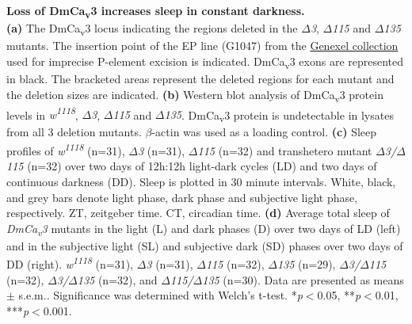 \label{fig:S2}
\textbf{Loss of DmCa\textsubscript{v}3 increases sleep in constant darkness.}
\\
\textbf{(a)} The DmCa\textsubscript{v}3 locus indicating the regions deleted in the \emph{$\Delta$3}, \emph{$\Delta$115} and \emph{$\Delta$135} mutants.
The insertion point of the EP line (G1047) from the \href{http://genexel.kaist.ac.kr}{Genexel collection} used for imprecise P-element excision is indicated.
DmCa\textsubscript{v}3 exons are represented in black.
The bracketed areas represent the deleted regions for each mutant and the deletion sizes are indicated.
\textbf{(b)} Western blot analysis of DmCa\textsubscript{v}3 protein levels in \emph{w\textsuperscript{1118}}, \emph{$\Delta$3}, \emph{$\Delta$115} and \emph{$\Delta$135}.
DmCa\textsubscript{v}3 protein is undetectable in lysates from all 3 deletion mutants.
$\beta$-actin was used as a loading control.
\textbf{(c)} Sleep profiles of \emph{w\textsuperscript{1118}} (n=31), \emph{$\Delta$3} (n=31), \emph{$\Delta$115} (n=32) and transhetero mutant \emph{$\Delta$3/$\Delta$115} (n=32) over two days of 12h:12h light-dark cycles (LD) and two days of continuous darkness (DD).
Sleep is plotted in 30 minute intervals.
White, black, and grey bars denote light phase, dark phase and subjective light phase, respectively.
ZT, zeitgeber time.
CT, circadian time.
\textbf{(d)} Average total sleep of \emph{DmCa\textsubscript{v}3} mutants in the light (L) and dark phases (D) over two days of LD (left) and in the subjective light (SL) and subjective dark (SD) phases over two days of DD (right).
\emph{w\textsuperscript{1118}} (n=31), \emph{$\Delta$3} (n=31), \emph{$\Delta$115} (n=32), \emph{$\Delta$135} (n=29), \emph{$\Delta$3/$\Delta$115} (n=32), \emph{$\Delta$3/$\Delta$135} (n=32), and \emph{$\Delta$115/$\Delta$135} (n=30).
Data are presented as means $\pm$ s.e.m..
Significance was determined with Welch's t-test.
*\emph{p}$<$0.05, **\emph{p}$<$0.01, ***\emph{p}$<$0.001.
